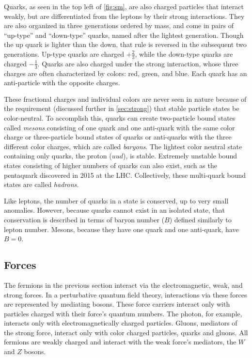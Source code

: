 Quarks, as seen in the top left of \autoref{fig:sm}, are also charged particles that interact weakly, but are differentiated from the leptons by their strong interactions. They are also organized in three generations ordered by mass, and come in pairs of ``up-type'' and ``down-type'' quarks, named after the lightest generation. Though the up quark is lighter than the down, that rule is reversed in the subsequent two generations. Up-type quarks are charged $+\frac{2}{3}$, while the down-type quarks are charged $-\frac{1}{3}$. Quarks are also charged under the strong interaction, whose three charges are often characterized by colors: red, green, and blue. Each quark has an anti-particle with the opposite charges. 

These fractional charges and individual colors are never seen in nature because of the requirement (discussed further in \autoref{sec:strong}) that stable particle states be color-neutral. To accomplish this, quarks can create two-particle bound states called \textit{mesons} consisting of one quark and one anti-quark with the same color charge or three-particle bound states of quarks or anti-quarks with the three different color charges, which are called \textit{baryons}. The lightest color neutral state containing only quarks, the proton ($uud$), is stable. Extremely unstable bound states consisting of higher numbers of quarks can also exist, such as the pentaquark discovered in 2015 at the \ac{LHC}. \cite{Pentaquark} Collectively, these multi-quark bound states are called \textit{hadrons}. 

Like leptons, the number of quarks in a state is conserved, up to very small anomalies. However, because quarks cannot exist in an isolated state, that conservation is described in terms of baryon number ($B$) defined similarly to lepton number. Mesons, because they have one quark and one anti-quark, have $B = 0$. 

\subsection{Forces}

The fermions in the previous section interact via the electromagnetic, weak, and strong forces. In a perturbative quantum field theory, interactions via these forces are represented by mediating bosons. These force carriers interact only with particles charged with their  force's quantum numbers. The photon, for example, interacts only with electromagnetically charged particles. Gluons, mediators of the strong force, interact only with color charged particles, quarks and gluons. All fermions are weakly charged and interact with the weak force's mediators, the $W$ and $Z$ bosons. 

